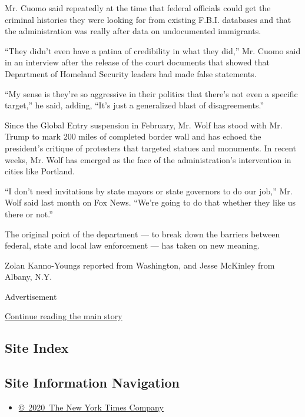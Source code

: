 Mr. Cuomo said repeatedly at the time that federal officials could get
the criminal histories they were looking for from existing F.B.I.
databases and that the administration was really after data on
undocumented immigrants.

``They didn't even have a patina of credibility in what they did,'' Mr.
Cuomo said in an interview after the release of the court documents that
showed that Department of Homeland Security leaders had made false
statements.

``My sense is they're so aggressive in their politics that there's not
even a specific target,'' he said, adding, ``It's just a generalized
blast of disagreements.''

Since the Global Entry suspension in February, Mr. Wolf has stood with
Mr. Trump to mark 200 miles of completed border wall and has echoed the
president's critique of protesters that targeted statues and monuments.
In recent weeks, Mr. Wolf has emerged as the face of the
administration's intervention in cities like Portland.

``I don't need invitations by state mayors or state governors to do our
job,'' Mr. Wolf said last month on Fox News. ``We're going to do that
whether they like us there or not.''

The original point of the department --- to break down the barriers
between federal, state and local law enforcement --- has taken on new
meaning.

Zolan Kanno-Youngs reported from Washington, and Jesse McKinley from
Albany, N.Y.

Advertisement

\protect\hyperlink{after-bottom}{Continue reading the main story}

\hypertarget{site-index}{%
\subsection{Site Index}\label{site-index}}

\hypertarget{site-information-navigation}{%
\subsection{Site Information
Navigation}\label{site-information-navigation}}

\begin{itemize}
\tightlist
\item
  \href{https://help.nytimes3xbfgragh.onion/hc/en-us/articles/115014792127-Copyright-notice}{©~2020~The
  New York Times Company}
\end{itemize}


